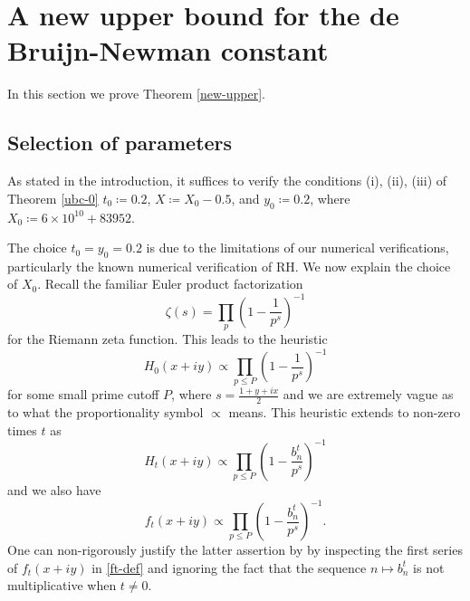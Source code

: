 \section{A new upper bound for the de Bruijn-Newman constant}\label{newup-sec}

In this section we prove Theorem \ref{new-upper}. 

\subsection{Selection of parameters}

As stated in the introduction, it suffices to verify the conditions (i), (ii), (iii) of Theorem \ref{ubc-0} $t_0 \coloneqq 0.2$, $X \coloneqq X_0-0.5$, and $y_0 \coloneqq 0.2$, where $X_0 \coloneqq 6 \times 10^{10} + 83952$.  

The choice $t_0=y_0=0.2$ is due to the limitations of our numerical verifications, particularly the known numerical verification of RH.  We now explain the choice of $X_0$.  Recall the familiar Euler product factorization
$$ \zeta(s) = \prod_p \left(1 - \frac{1}{p^s}\right)^{-1}$$
for the Riemann zeta function.  This leads to the heuristic
$$ H_0(x+iy) \propto \prod_{p \leq P} \left(1 - \frac{1}{p^s}\right)^{-1}$$
for some small prime cutoff $P$, where $s = \frac{1+y+ix}{2}$ and we are extremely vague as to what the proportionality symbol $\propto$ means.  This heuristic extends to non-zero times $t$ as
$$ H_t(x+iy) \propto \prod_{p \leq P} \left(1 - \frac{b_n^t}{p^s}\right)^{-1}$$
and we also have
\begin{equation}\label{oscil}
 f_t(x+iy) \propto \prod_{p \leq P} \left(1 - \frac{b_n^t}{p^s}\right)^{-1}.
\end{equation}
One can non-rigorously justify the latter assertion by by inspecting the first series of $f_t(x+iy)$ in \eqref{ft-def} and ignoring the fact that the sequence $n \mapsto b_n^t$ is not multiplicative when $t \neq 0$.  

